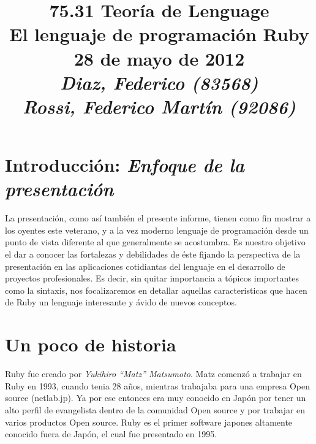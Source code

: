 \documentclass{article}
\begin{document}
\title{\huge 75.31 Teoría de Lenguage \\ 
	  \Huge El lenguaje de programación Ruby \\
	  \bigskip \Large 28 de mayo de 2012 \\
	  \bigskip\bigskip \large\textit{Diaz, Federico (83568)\\Rossi, Federico Martín (92086)}}
\date{}
\maketitle




\section{Introducción: \textit{Enfoque de la presentación}}

La presentación, como así también el presente informe, tienen como fin mostrar a los oyentes este veterano, y a la vez moderno lenguaje de programación desde un punto de vista diferente al que generalmente se acostumbra. Es nuestro objetivo el dar a conocer las fortalezas y debilidades de éste fijando la perspectiva de la presentación en las aplicaciones cotidiantas del lenguaje en el desarrollo de proyectos profesionales. Es decir, sin quitar importancia a tópicos importantes como la sintaxis, nos focalizaremos en detallar aquellas caracteristicas que hacen de Ruby un lenguaje interesante y ávido de nuevos conceptos.




\section{Un poco de historia}

Ruby fue creado por \textit{Yukihiro ``Matz'' Matsumoto}. Matz comenzó a trabajar en Ruby en 1993, cuando tenia 28 años, mientras trabajaba para una empresa Open source (netlab.jp). Ya por ese entonces era muy conocido en Japón por tener un alto perfil de evangelista dentro de la comunidad Open source y por trabajar en varios productos Open source. Ruby es el primer software japones altamente conocido fuera de Japón, el cual fue presentado en 1995.
\end{document}
